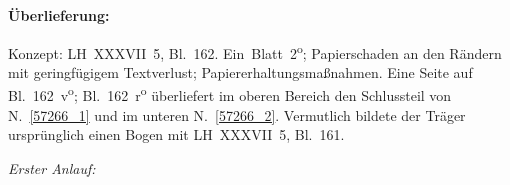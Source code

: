 %  
%
%
%
\frenchspacing
%
\begin{ledgroupsized}[r]{120mm}
\footnotesize
\pstart
\noindent\textbf{Überlieferung:}
\pend
\end{ledgroupsized}
%
\begin{ledgroupsized}[r]{114mm}
\footnotesize
\pstart \parindent -6mm
%
Konzept: LH~XXXVII~5, Bl.~162.
Ein~Blatt~2\textsuperscript{o};
Papierschaden an den Rändern mit geringfügigem Textverlust;
Papiererhaltungsmaßnahmen.
Eine Seite auf Bl.~162~v\textsuperscript{o};	
Bl.~162~r\textsuperscript{o} überliefert im oberen Bereich den Schlussteil von N.~\ref{57266_1} und
im unteren N.~\ref{57266_2}.
Vermutlich bildete der Träger ursprünglich einen Bogen mit LH~XXXVII~5, Bl.~161.
\pend
\end{ledgroupsized}
%
%
\frenchspacing
\vspace{8mm}
\pstart%
\normalsize%
\noindent%
\pend%
\count{}%
\count{}%
\count{}
%
\pstart\noindent
\lbrack%
\textit{Erster Anlauf:}\rbrack 
\pend
%
\vspace{1.5em} %
